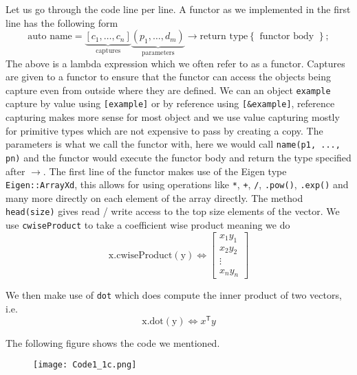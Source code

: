 \documentclass{article}
\begin{document}
\noindent Let us go through the code line per line. A functor as we implemented in the first line has the following form
\begin{equation*}
    \text{auto name} = \underbrace{\left[c_{1}, \dots, c_{n}\right]}_{\text{captures}}\underbrace{\left(p_{1}, \dots, d_{m}\right)}_{\text{parameters}} \rightarrow \text{return type} \left\{ \text{ functor body } \right\};
\end{equation*}
The above is a lambda expression which we often refer to as a functor. Captures are given to a functor to ensure that the functor can access the objects being capture even from outside where they are defined. We can an object \verb|example| capture by value using \verb|[example]| or by reference using \verb|[&example]|, reference capturing makes more sense for most object and we use value capturing mostly for primitive types which are not expensive to pass by creating a copy. The parameters is what we call the functor with, here we would call \verb|name(p1, ..., pn)| and the functor would execute the functor body and return the type specified after $\rightarrow$.
\noindent The first line of the functor makes use of the Eigen type \verb|Eigen::ArrayXd|, this allows for using operations like \verb|*|, \verb|+|, \verb|/|, \verb|.pow()|, \verb|.exp()| and many more directly on each element of the array directly. The method \verb|head(size)| gives read / write access to the top size elements of the vector. We use \verb|cwiseProduct| to take a coefficient wise product meaning we do
 \begin{equation*}
     \mathrm{x.cwiseProduct(y)} \Longleftrightarrow \begin{bmatrix}
         x_{1}y_{1} \\
         x_{2}y_{2} \\
         \vdots \\
         x_{n}y_{n}
     \end{bmatrix}
 \end{equation*}

\noindent We then make use of \verb|dot| which does compute the inner product of two vectors, i.e.
\begin{equation*}
    \mathrm{x.dot(y)} \Longleftrightarrow x^{\mathsf{T}}y
\end{equation*}

The following figure shows the code we mentioned.

\begin{figure}[!hbt]
    \centering
\texttt{[image: Code1\_1c.png]}
\end{figure}
\end{document}
